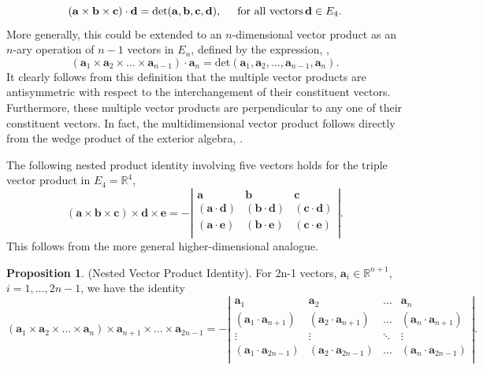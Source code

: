 \documentclass[fleqn,11pt,twoside]{article}
\theoremstyle{definition}
\newtheorem{prop}{Proposition}
\begin{document}
\begin{equation}
(\mathbf{a}\times\mathbf{b}\times\mathbf{c})\cdot\mathbf{d}=\mbox{det}(\mathbf{a},\mathbf{b},\mathbf{c},\mathbf{d}),\hspace{5mm}\mathrm{for\,\,all\,\, vectors}\,\mathbf{d}\in E_4.
\end{equation}
More generally, this could be extended to an $n$-dimensional vector product as an $n$-ary operation of $n-1$ vectors in $E_n$, defined by the expression, \cite{Grassman,Acosta}, 
\begin{equation}
(\mathbf{a}_1\times\mathbf{a}_2\times\dots\times\mathbf{a}_{n-1})\cdot\mathbf{a}_n=\mbox{det}(\mathbf{a}_1,\mathbf{a}_2,\dots,\mathbf{a}_{n-1},\mathbf{a}_n).
\end{equation}
It clearly follows from this definition that the multiple vector products are antisymmetric with respect to the interchangement of their constituent vectors. Furthermore, these multiple vector products are perpendicular to any one of their constituent vectors. In fact, the multidimensional vector product 
follows directly from the wedge product of the exterior algebra, 
\cite{Janich}. 

The following nested product identity involving five vectors holds for the triple vector product in $E_4=\mathbb{R}^{4}$,
\begin{equation}
(\mathbf{a}\times\mathbf{b}\times\mathbf{c})\times\mathbf{d}\times\mathbf{e}=-
\left|
\begin{array}{ccc}
\mathbf{a}&
\mathbf{b}&
\mathbf{c}\\
(\mathbf{a}\cdot\mathbf{d})&
(\mathbf{b}\cdot\mathbf{d})&
(\mathbf{c}\cdot\mathbf{d})\\
(\mathbf{a}\cdot\mathbf{e})&
(\mathbf{b}\cdot\mathbf{e})&
(\mathbf{c}\cdot\mathbf{e})\\
\end{array}
\right|.
\end{equation}
This follows from the more general higher-dimensional analogue. 

\begin{prop} {\rm (Nested Vector Product Identity)}. 
For 2n-1 vectors, $\mathbf{a}_i\in \mathbb{R}^{n+1}$, $i=1,\dots,2n-1$, we have the identity 
\begin{equation}
(\mathbf{a}_1\times\mathbf{a}_2\times\dots\times\mathbf{a}_n)\times\mathbf{a}_{n+1}\times\dots\times\mathbf{a}_{2n-1}=-
\left|
\begin{array}{cccc}
\mathbf{a}_1&
\mathbf{a}_2&
\dots&
\mathbf{a}_n\\
(\mathbf{a}_1\cdot\mathbf{a}_{n+1})&
(\mathbf{a}_2\cdot\mathbf{a}_{n+1})&
\dots&
(\mathbf{a}_n\cdot\mathbf{a}_{n+1})\\
\vdots&
\vdots&
\ddots&
\vdots\\
(\mathbf{a}_1\cdot\mathbf{a}_{2n-1})&
(\mathbf{a}_2\cdot\mathbf{a}_{2n-1})&
\dots&
(\mathbf{a}_n\cdot\mathbf{a}_{2n-1})\\
\end{array}
\right|.
\end{equation}\end{prop} 
\end{document}
